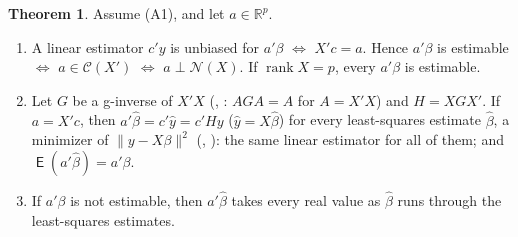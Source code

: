 \documentclass[12pt]{article}
\newcommand{\R}{\mathbb R}
\DeclareMathOperator{\rank}{rank}
\DeclareMathOperator\expc{\mathsf{E}}
\theoremstyle{definition}
\newtheorem{theorem}{Theorem}
\begin{document}
\begin{theorem}\label{h-thm-estimable}
Assume (A1), and let \(a\in\R^p\).
\begin{enumerate}
\item A linear estimator \(c'y\) is unbiased for \(a'\beta\) \(\iff\) \(X'c=a\). Hence \(a'\beta\) is estimable \(\iff\)
\(a\in\mathcal C(X')\) \(\iff\) \(a\perp\mathcal N(X)\). If \(\rank X=p\), every \(a'\beta\) is estimable.
\item Let \(G\) be a g-inverse of \(X'X\) (, : \(AGA=A\) for \(A=X'X\)) and \(H=XGX'\). If
\(a=X'c\), then \(a'\hat\beta=c'\hat y=c'Hy\) (\(\hat y=X\hat\beta\)) for every least-squares estimate \(\hat\beta\), a
minimizer of \(\lVert y-X\beta\rVert^2\) (, ): the same linear estimator for all of them; and
\(\expc(a'\hat\beta)=a'\beta\).
\item If \(a'\beta\) is not estimable, then \(a'\hat\beta\) takes every real value as \(\hat\beta\) runs through the
least-squares estimates.
\end{enumerate}
\end{theorem}
\end{document}
